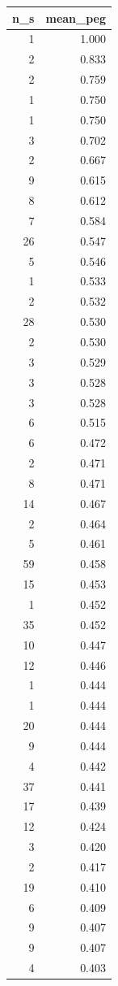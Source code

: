 \begin{tabular}{rr}
\toprule
n_s & mean_peg \\
\midrule
1 & 1.000 \\
2 & 0.833 \\
2 & 0.759 \\
1 & 0.750 \\
1 & 0.750 \\
3 & 0.702 \\
2 & 0.667 \\
9 & 0.615 \\
8 & 0.612 \\
7 & 0.584 \\
26 & 0.547 \\
5 & 0.546 \\
1 & 0.533 \\
2 & 0.532 \\
28 & 0.530 \\
2 & 0.530 \\
3 & 0.529 \\
3 & 0.528 \\
3 & 0.528 \\
6 & 0.515 \\
6 & 0.472 \\
2 & 0.471 \\
8 & 0.471 \\
14 & 0.467 \\
2 & 0.464 \\
5 & 0.461 \\
59 & 0.458 \\
15 & 0.453 \\
1 & 0.452 \\
35 & 0.452 \\
10 & 0.447 \\
12 & 0.446 \\
1 & 0.444 \\
1 & 0.444 \\
20 & 0.444 \\
9 & 0.444 \\
4 & 0.442 \\
37 & 0.441 \\
17 & 0.439 \\
12 & 0.424 \\
3 & 0.420 \\
2 & 0.417 \\
19 & 0.410 \\
6 & 0.409 \\
9 & 0.407 \\
9 & 0.407 \\
4 & 0.403 \\

\end{tabular}
